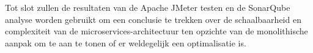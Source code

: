 Tot slot zullen de resultaten van de Apache JMeter testen en de SonarQube analyse worden gebruikt om een conclusie te trekken over de schaalbaarheid en complexiteit van de microservices-architectuur ten opzichte van de monolithische aanpak om te aan te tonen of er weldegelijk een optimalisatie is.


